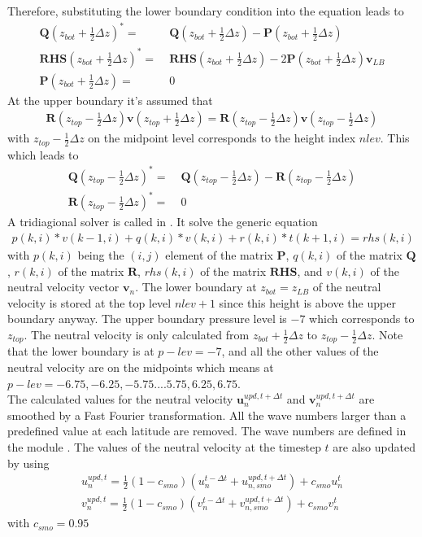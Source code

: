 Therefore, substituting the lower boundary condition into the
equation leads to
%
\begin{align}
  \mathbf{Q}(z_{bot}+\frac{1}{2}\Delta z)^*= & \; \mathbf{Q}(z_{bot}+\frac{1}{2}\Delta z)-\mathbf{P}(z_{bot}+\frac{1}{2}\Delta z)
  \\
  \mathbf{RHS}(z_{bot}+\frac{1}{2}\Delta z)^*= & \; \mathbf{RHS}(z_{bot}+\frac{1}{2}\Delta z)-2
  \mathbf{P}(z_{bot}+\frac{1}{2}\Delta z)\mathbf{v}_{LB} \\
  \mathbf{P}(z_{bot}+\frac{1}{2}\Delta z) = & \; 0
\end{align}
%
At the upper boundary it's assumed that
%
\begin{align}
  \mathbf{R}(z_{top}-\frac{1}{2}\Delta z)\mathbf{v}(z_{top}+\frac{1}{2}\Delta z) =
  \mathbf{R}(z_{top}-\frac{1}{2}\Delta z)\mathbf{v}(z_{top}-\frac{1}{2}\Delta z)
\end{align}
%
with $z_{top}-\frac{1}{2}\Delta z$ on the midpoint level corresponds
to the height index $nlev$. This which leads to
%
\begin{align}
  \mathbf{Q}(z_{top}-\frac{1}{2}\Delta z)^*= & \;
    \mathbf{Q}(z_{top}-\frac{1}{2}\Delta z)-\mathbf{R}(z_{top}-\frac{1}{2}\Delta z)
  \\
  \mathbf{R}(z_{top}-\frac{1}{2}\Delta z)^*= & \; 0
\end{align}
%
A tridiagional solver
is called in . It solve the generic equation
%
%
\begin{align}
 p(k,i)*v(k-1,i) + q(k,i)*v(k,i)+r(k,i)*t(k+1,i) = rhs(k,i)
\end{align}
%
with  $p(k,i)$ being the $(i,j)$ element of the matrix $\mathbf{P}$,
$q(k,i)$ of the matrix $\mathbf{Q}$, $r(k,i)$ of the matrix
$\mathbf{R}$, $rhs(k,i)$ of the matrix $\mathbf{RHS}$, and $v(k,i)$
of the neutral velocity vector $\mathbf{v}_n $. The lower boundary
at $z_{bot}=z_{LB}$ of the neutral velocity is stored at the top
level $nlev+1$ since this height is above the upper boundary anyway.
The upper boundary pressure level is $-7$ which corresponds to
$z_{top}$. The neutral velocity is only calculated from
$z_{bot}+\frac{1}{2}\Delta z$ to $z_{top}-\frac{1}{2}\Delta z$. Note
that the lower boundary is at $p-lev=-7$, and all the other values
of the neutral velocity are on the midpoints which means at $p-lev =
-6.75, -6.25, -5.75 ....5.75, 6.25, 6.75$.
\\

The calculated values for the neutral velocity $\mathbf{u}_n^{upd, t
+ \Delta t}$ and $\mathbf{v}_n^{upd, t + \Delta t}$ are smoothed by
a Fast Fourier transformation. All the wave numbers larger than a
predefined value at each latitude are removed. The wave numbers are
defined in the module . The values of the neutral
velocity at the timestep $t$ are also updated by using
%
\begin{align}
  u_n^{upd,t} = \frac{1}{2}({1-c_{smo}})(u_n^{t-\Delta t}+
     u_{n,smo}^{upd,t+\Delta t}) + c_{smo}u_n^t \\
  v_n^{upd,t} = \frac{1}{2}({1-c_{smo}})(v_n^{t-\Delta t}+
     v_{n,smo}^{upd,t+\Delta t}) + c_{smo}v_n^t
\end{align}
%
with $c_{smo} = 0.95$
